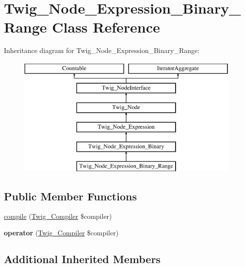 \hypertarget{class_twig___node___expression___binary___range}{}\section{Twig\+\_\+\+Node\+\_\+\+Expression\+\_\+\+Binary\+\_\+\+Range Class Reference}
\label{class_twig___node___expression___binary___range}
Inheritance diagram for Twig\+\_\+\+Node\+\_\+\+Expression\+\_\+\+Binary\+\_\+\+Range\+:\begin{figure}[H]
\begin{center}
\leavevmode
\includegraphics[height=6.000000cm]{class_twig___node___expression___binary___range}
\end{center}
\end{figure}
\subsection*{Public Member Functions}
\begin{DoxyCompactItemize}
\item 
\hyperlink{class_twig___node___expression___binary___range_a4e0faa87c3fae583620b84d3607085da}{compile} (\hyperlink{class_twig___compiler}{Twig\+\_\+\+Compiler} \$compiler)
\item 
\hypertarget{class_twig___node___expression___binary___range_af77318ec88d5f8a508684970a150b670}{}{\bfseries operator} (\hyperlink{class_twig___compiler}{Twig\+\_\+\+Compiler} \$compiler)\label{class_twig___node___expression___binary___range_af77318ec88d5f8a508684970a150b670}

\end{DoxyCompactItemize}
\subsection*{Additional Inherited Members}


